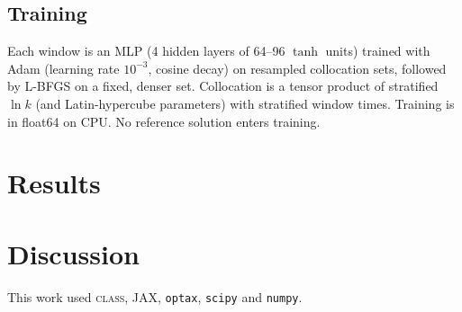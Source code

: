 \documentclass[prd,twocolumn,superscriptaddress,nofootinbib,floatfix]{revtex4-2}
\begin{document}
\subsection{Training}
Each window is an MLP (4 hidden layers of 64--96 $\tanh$ units) trained with Adam (learning rate $10^{-3}$, cosine decay) on resampled collocation sets, followed by L-BFGS on a fixed, denser set. Collocation is a tensor product of stratified $\ln k$ (and Latin-hypercube parameters) with stratified window times. Training is in float64 on CPU. No reference solution enters training.

\section{Results}\label{sec:results}



\section{Discussion}\label{sec:discussion}



\begin{acknowledgments}
[Acknowledgments.] This work used \textsc{class}, JAX, \texttt{optax}, \texttt{scipy} and \texttt{numpy}.
\end{acknowledgments}


\end{document}
